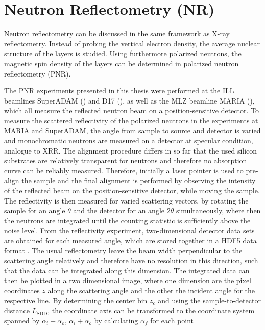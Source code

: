 \documentclass[\main/dresen_thesis.tex]{subfiles}
\begin{document}
  \section{Neutron Reflectometry (NR)}
    \label{ch:methods:nr}
    Neutron reflectometry can be discussed in the same framework as X-ray reflectometry.
    Instead of probing the vertical electron density, the average nuclear structure of the layers is studied.
    Using furthermore polarized neutrons, the magnetic spin density of the layers can be determined in polarized neutron reflectometry (PNR).

    The PNR experiments presented in this thesis were performed at the ILL beamlines SuperADAM () and D17 (), as well as the MLZ beamline MARIA (), which all measure the reflected neutron beam on a position-sensitive detector.
    To measure the scattered reflectivity of the polarized neutrons in the experiments at MARIA and SuperADAM, the angle from sample to source and detector is varied and monochromatic neutrons are measured on a detector at specular condition, analogue to XRR.
    The alignment procedure differs in so far that the used silicon substrates are relatively transparent for neutrons and therefore no absorption curve can be reliably measured.
    Therefore, initially a laser pointer is used to pre-align the sample and the final alignment is performed by observing the intensity of the reflected beam on the position-sensitive detector, while moving the sample.
    The reflectivity is then measured for varied scattering vectors, by rotating the sample for an angle $\theta$ and the detector for an angle $2 \theta$ simultaneously, where then the neutrons are integrated until the counting statistic is sufficiently above the noise level.
    From the reflectivity experiment, two-dimensional detector data sets are obtained for each measured angle, which are stored together in a HDF5 data format \cite{HDF5_1997_Hiera}.
    The usual reflectometry leave the beam width perpendicular to the scattering angle relatively and therefore have no resolution in this direction, such that the data can be integrated along this dimension.
    The integrated data can then be plotted in a two dimensional image, where one dimension are the pixel coordinates $z$ along the scattering angle and the other the incident angle for the respective line.
    By determining the center bin $z_c$ and using the sample-to-detector distance $L_\mathrm{SDD}$, the coordinate axis can be transformed to the coordinate system spanned by $\alpha_i - \alpha_o,\,\alpha_i+\alpha_o$ by calculating $\alpha_f$ for each point
\end{document}
